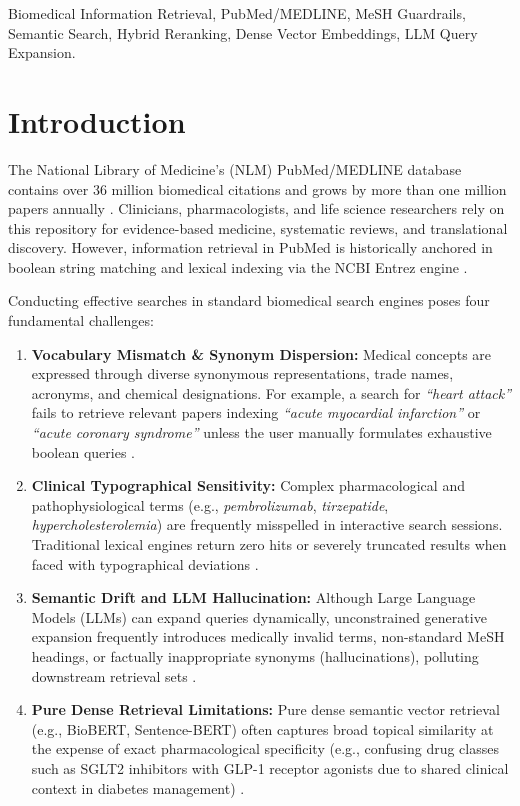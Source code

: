 \documentclass[conference]{IEEEtran}
\begin{document}
\begin{IEEEkeywords}
Biomedical Information Retrieval, PubMed/MEDLINE, MeSH Guardrails, Semantic Search, Hybrid Reranking, Dense Vector Embeddings, LLM Query Expansion.
\end{IEEEkeywords}

\section{Introduction}
The National Library of Medicine's (NLM) PubMed/MEDLINE database contains over 36 million biomedical citations and grows by more than one million papers annually \cite{pubmed_overview}. Clinicians, pharmacologists, and life science researchers rely on this repository for evidence-based medicine, systematic reviews, and translational discovery. However, information retrieval in PubMed is historically anchored in boolean string matching and lexical indexing via the NCBI Entrez engine \cite{sayers_entrez}.

Conducting effective searches in standard biomedical search engines poses four fundamental challenges:
\begin{enumerate}
    \item \textbf{Vocabulary Mismatch \& Synonym Dispersion:} Medical concepts are expressed through diverse synonymous representations, trade names, acronyms, and chemical designations. For example, a search for \textit{``heart attack''} fails to retrieve relevant papers indexing \textit{``acute myocardial infarction''} or \textit{``acute coronary syndrome''} unless the user manually formulates exhaustive boolean queries \cite{lu_pubmed}.
    \item \textbf{Clinical Typographical Sensitivity:} Complex pharmacological and pathophysiological terms (e.g., \textit{pembrolizumab}, \textit{tirzepatide}, \textit{hypercholesterolemia}) are frequently misspelled in interactive search sessions. Traditional lexical engines return zero hits or severely truncated results when faced with typographical deviations \cite{dsouza_spell}.
    \item \textbf{Semantic Drift and LLM Hallucination:} Although Large Language Models (LLMs) can expand queries dynamically, unconstrained generative expansion frequently introduces medically invalid terms, non-standard MeSH headings, or factually inappropriate synonyms (hallucinations), polluting downstream retrieval sets \cite{ji_hallucination}.
    \item \textbf{Pure Dense Retrieval Limitations:} Pure dense semantic vector retrieval (e.g., BioBERT, Sentence-BERT) often captures broad topical similarity at the expense of exact pharmacological specificity (e.g., confusing drug classes such as SGLT2 inhibitors with GLP-1 receptor agonists due to shared clinical context in diabetes management) \cite{thakur_beir}.
\end{enumerate}
\end{document}

